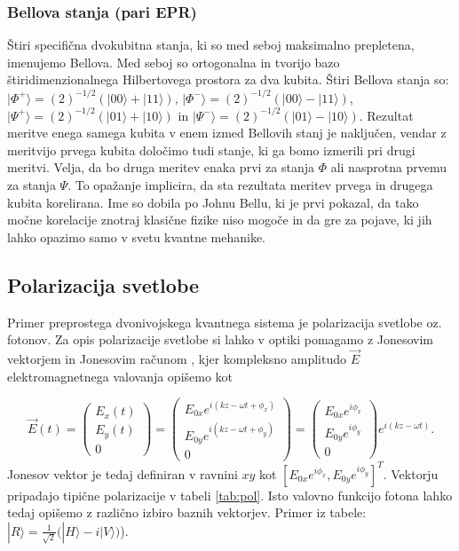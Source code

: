 \documentclass[12pt]{article}
\begin{document}
\subsubsection{Bellova stanja (pari EPR)}
Štiri specifična dvokubitna stanja, ki so med seboj maksimalno prepletena, imenujemo Bellova. Med seboj so ortogonalna in tvorijo bazo štiridimenzionalnega Hilbertovega prostora za dva kubita. Štiri Bellova stanja so: $|\Phi ^{+}\rangle = {\displaystyle { {(2)^{-1/2}(|00\rangle +|11\rangle )}}} $, $|\Phi ^{-}\rangle = {\displaystyle { {(2)^{-1/2}(|00\rangle -|11\rangle )}}}$, $|\Psi ^{+}\rangle = {\displaystyle { {(2)^{-1/2}(|01\rangle +|10\rangle )}}}$ in $|\Psi ^{-}\rangle = {\displaystyle { {(2)^{-1/2}(|01\rangle -|10\rangle )}}}$. Rezultat meritve enega samega kubita v enem izmed Bellovih stanj je naključen, vendar z meritvijo prvega kubita določimo tudi stanje, ki ga bomo izmerili pri drugi meritvi. Velja, da bo druga meritev enaka prvi za stanja $\Phi$ ali nasprotna prvemu za stanja $\Psi$. To opažanje implicira, da sta rezultata meritev prvega in drugega kubita korelirana. Ime so dobila po Johnu Bellu, ki je prvi pokazal, da tako močne korelacije znotraj klasične fizike niso mogoče in da gre za pojave, ki jih lahko opazimo samo v svetu kvantne mehanike. \cite{BellState2023}


\subsection{Polarizacija svetlobe}

Primer preprostega dvonivojskega kvantnega sistema je polarizacija svetlobe oz. fotonov. Za opis polarizacije svetlobe si lahko v optiki pomagamo z Jonesovim vektorjem in Jonesovim računom \cite{JonesCalculus2023}, kjer kompleksno amplitudo $\vec{E}$ elektromagnetnega valovanja opišemo kot

\begin{equation}
{\displaystyle \vec{E}(t) = {\begin{pmatrix}E_{x}(t)\\E_{y}(t)\\0\end{pmatrix}}={\begin{pmatrix}E_{0x}e^{i(kz-\omega t+\phi _{x})}\\E_{0y}e^{i(kz-\omega t+\phi _{y})}\\0\end{pmatrix}}={\begin{pmatrix}E_{0x}e^{i\phi _{x}}\\E_{0y}e^{i\phi _{y}}\\0\end{pmatrix}}e^{i(kz-\omega t)}.}
\end{equation}  
Jonesov vektor je tedaj definiran v ravnini $xy$ kot $ [ E_{0x}e^{i\phi _{x}}, E_{0y}e^{i\phi _{y}}]^T$. Vektorju pripadajo tipične polarizacije v tabeli \ref{tab:pol}. Isto valovno funkcijo fotona lahko tedaj opišemo z različno izbiro baznih vektorjev. Primer iz tabele: $ { |R\rangle ={\frac {1}{\sqrt {2}}}{\big (}|H\rangle -i|V\rangle {\big )}} $). 
\end{document}
